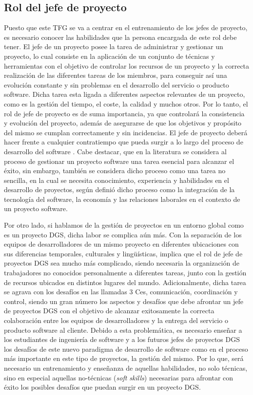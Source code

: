 \subsection{Rol del jefe de proyecto}
\label{sec:ImportanciaJP}

Puesto que este TFG se va a centrar en el entrenamiento de los jefes de proyecto, es necesario conocer las habilidades que la persona encargada de este rol debe tener. El jefe de un proyecto posee la tarea de administrar y gestionar un proyecto, lo cual consiste en la aplicación de un conjunto de técnicas y herramientas con el objetivo de controlar los recursos de un proyecto y la correcta realización de las diferentes tareas de los miembros, para conseguir así una evolución constante y sin problemas en el desarrollo del servicio o producto software. Dicha tarea esta ligada a diferentes aspectos relevantes de un proyecto, como es la gestión del tiempo, el coste, la calidad y muchos otros. Por lo tanto, el rol de jefe de proyecto es de suma importancia, ya que controlará la consistencia y evolución del proyecto, además de asegurarse de que los objetivos y propósito del mismo se cumplan correctamente y sin incidencias. El jefe de proyecto deberá hacer frente a cualquier contratiempo que pueda surgir a lo largo del proceso de desarrollo del software \cite{colomo2014project}. Cabe destacar, que en la literatura se considera al proceso de gestionar un proyecto software una tarea esencial para alcanzar el éxito, sin embargo, también se considera dicho proceso como una tarea no sencilla, en la cual se necesita conocimiento, experiencia y habilidades en el desarrollo de proyectos, según \cite{boehm1989theory} definió dicho proceso como la integración de la tecnología del software, la economía y las relaciones laborales en el contexto de un proyecto software. 

Por otro lado, si hablamos de la gestión de proyectos en un entorno global como es un proyecto DGS, dicha labor se complica aún más. Con la separación de los equipos de desarrolladores de un mismo proyecto en diferentes ubicaciones con sus diferencias temporales, culturales y lingüísticas, implica que el rol de jefe de proyectos DGS sea mucho más complicado, siendo necesaria la organización de trabajadores no conocidos personalmente a diferentes tareas, junto con la gestión de recursos ubicados en distintos lugares del mundo. Adicionalmente, dicha tarea se agrava con los desafíos en las llamadas 3 Ces, comunicación, coordinación y control, siendo un gran número los aspectos y desafíos que debe afrontar un jefe de proyectos DGS con el objetivo de alcanzar exitosamente la correcta colaboración entre los equipos de desarrolladores y la entrega del servicio o producto software al cliente. Debido a esta problemática, es necesario enseñar a los estudiantes de ingeniería de software y a los futuros jefes de proyectos DGS los desafíos de este nuevo paradigma de desarrollo de software como en el proceso más importante en este tipo de proyectos, la gestión del mismo. Por lo que, será necesario un entrenamiento y enseñanza de aquellas habilidades, no solo técnicas, sino en especial aquellas no-técnicas (\emph{soft skills}) necesarias para afrontar con éxito los posibles desafíos que puedan surgir en un proyecto DGS.

